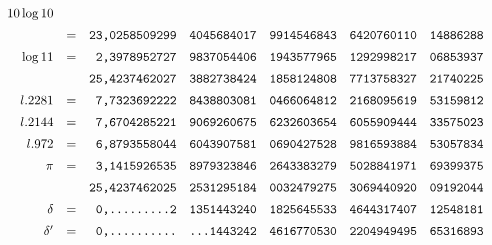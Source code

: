 \begingroup\footnotesize\setlength{\arraycolsep}{1pt}\renewcommand{\arraystretch}{1.12}\[
\begin{array}{rcrlllll}
10\log10&&&&&&&\\[5pt]
&=&\text{\ttfamily 23,0258509299}&\text{\ttfamily 4045684017}&\text{\ttfamily 9914546843}&\text{\ttfamily 6420760110}&\text{\ttfamily 14886288}&\\[5pt]
\log11&=&\text{\ttfamily 2,3978952727}&\text{\ttfamily 9837054406}&\text{\ttfamily 1943577965}&\text{\ttfamily 1292998217}&\text{\ttfamily 06853937}&\\[5pt]
&&\text{\ttfamily 25,4237462027}&\text{\ttfamily 3882738424}&\text{\ttfamily 1858124808}&\text{\ttfamily 7713758327}&\text{\ttfamily 21740225}&\\[5pt]
l.2281&=&\text{\ttfamily 7,7323692222}&\text{\ttfamily 8438803081}&\text{\ttfamily 0466064812}&\text{\ttfamily 2168095619}&\text{\ttfamily 53159812}&\\[5pt]
l.2144&=&\text{\ttfamily 7,6704285221}&\text{\ttfamily 9069260675}&\text{\ttfamily 6232603654}&\text{\ttfamily 6055909444}&\text{\ttfamily 33575023}&\\[5pt]
l.972&=&\text{\ttfamily 6,8793558044}&\text{\ttfamily 6043907581}&\text{\ttfamily 0690427528}&\text{\ttfamily 9816593884}&\text{\ttfamily 53057834}&\\[5pt]
\pi&=&\text{\ttfamily 3,1415926535}&\text{\ttfamily 8979323846}&\text{\ttfamily 2643383279}&\text{\ttfamily 5028841971}&\text{\ttfamily 69399375}&\\[5pt]
&&\text{\ttfamily 25,4237462025}&\text{\ttfamily 2531295184}&\text{\ttfamily 0032479275}&\text{\ttfamily 3069440920}&\text{\ttfamily 09192044}&\\[5pt]
\delta&=&\text{\ttfamily 0,.........2}&\text{\ttfamily 1351443240}&\text{\ttfamily 1825645533}&\text{\ttfamily 4644317407}&\text{\ttfamily 12548181}&\\[5pt]
\delta'&=&\text{\ttfamily 0,..........}&\text{\ttfamily ...1443242}&\text{\ttfamily 4616770530}&\text{\ttfamily 2204949495}&\text{\ttfamily 65316893}&\\[5pt]

\end{array}\]
